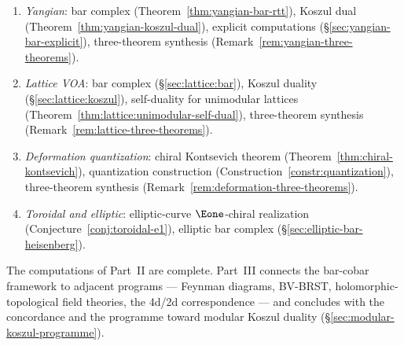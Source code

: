 \begin{remark}
\begin{enumerate}
  Koszul duality (the proposed comparison in Remark~\ref{thm:w-algebra-koszul-main}),
  genus-$1$ pipeline (\S\ref{sec:w3-genus-one-pipeline}),
  general $\kappa$ formula (Theorem~\ref{thm:wn-obstruction}),
  three-theorem synthesis
  (Remark~\ref{rem:w-algebra-three-theorems}).
\item \emph{Yangian}:
  bar complex (Theorem~\ref{thm:yangian-bar-rtt}),
  Koszul dual (Theorem~\ref{thm:yangian-koszul-dual}),
  explicit computations (\S\ref{sec:yangian-bar-explicit}),
  three-theorem synthesis
  (Remark~\ref{rem:yangian-three-theorems}).
\item \emph{Lattice VOA}:
  bar complex (\S\ref{sec:lattice:bar}),
  Koszul duality (\S\ref{sec:lattice:koszul}),
  self-duality for unimodular lattices
  (Theorem~\ref{thm:lattice:unimodular-self-dual}),
  three-theorem synthesis
  (Remark~\ref{rem:lattice-three-theorems}).
\item \emph{Deformation quantization}:
  chiral Kontsevich theorem
  (Theorem~\ref{thm:chiral-kontsevich}),
  quantization construction
  (Construction~\ref{constr:quantization}),
  three-theorem synthesis
  (Remark~\ref{rem:deformation-three-theorems}).
\item \emph{Toroidal and elliptic}:
  elliptic-curve $\Eone$-chiral realization
  (Conjecture~\ref{conj:toroidal-e1}),
  elliptic bar complex
  (\S\ref{sec:elliptic-bar-heisenberg}).
\end{enumerate}
\end{remark}

\medskip

\noindent
The computations of Part~II are complete.  Part~III connects the bar-cobar framework to adjacent programs --- Feynman diagrams, BV-BRST, holomorphic-topological field theories, the 4d/2d correspondence --- and concludes with the concordance and the programme toward modular Koszul duality (\S\ref{sec:modular-koszul-programme}).
